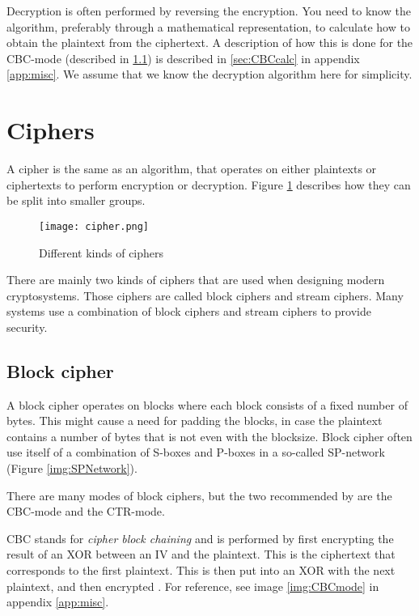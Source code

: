 Decryption is often performed by reversing the encryption. You need to know the 
algorithm, preferably through a mathematical representation, to calculate how 
to obtain the plaintext from the ciphertext. A description of how this is done 
for the CBC-mode (described in \ref{sec:BlockCipher}) is described in 
\ref{sec:CBCcalc} in appendix \ref{app:misc}. We assume that we know the 
decryption algorithm here for simplicity. 

\section{Ciphers}
A cipher is the same as an algorithm, that operates on either plaintexts or 
ciphertexts to perform encryption or decryption. Figure \ref{img:ciphers} 
describes how they can be split into smaller groups.

\begin{figure}
  \texttt{[image: cipher.png]}
  \caption{Different kinds of ciphers \citep{CipherTax:2013}}
  \label{img:ciphers}
\end{figure}

There are mainly two kinds of ciphers that are used when designing modern 
cryptosystems. Those ciphers are called block ciphers and stream ciphers. 
Many systems use a combination of block ciphers and stream ciphers to provide 
security. 

\subsection{Block cipher}\label{sec:BlockCipher}
A block cipher operates on blocks where each block consists of a fixed number 
of bytes. This might cause a need for padding the blocks, in case the plaintext 
contains a number of bytes that is not even with the blocksize. Block cipher 
often use itself of a combination of S-boxes and P-boxes in a so-called 
SP-network (Figure \ref{img:SPNetwork}).

There are many modes of block ciphers, but the two recommended by 
\citet{Schneier:2003} are the CBC-mode and the CTR-mode.

CBC stands for \emph{cipher block chaining} and is performed by first encrypting 
the result of an XOR between an IV and the plaintext. This is the ciphertext 
that corresponds to the first plaintext. This is then put into an XOR with the 
next plaintext, and then encrypted \citep[pp. 109--111]{Stinson:2006}. For 
reference, see image \ref{img:CBCmode} in appendix \ref{app:misc}.

